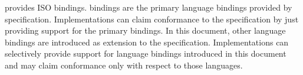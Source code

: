 \openshmem provides ISO \Cstd bindings. \Cstd bindings are the primary language
bindings provided by \openshmem specification. Implementations can claim
conformance to the specification by just providing support for the primary \Cstd
bindings. In this document, other language bindings are introduced as extension
to the \openshmem specification. Implementations can selectively provide support
for language bindings introduced in this document and may claim conformance only
with respect to those languages.
